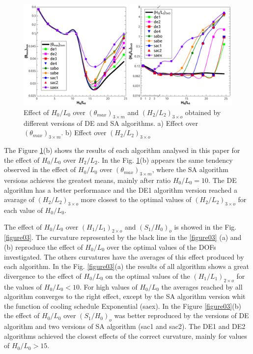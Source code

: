 \documentclass[12pt,fleqn]{article}
\begin{document}
\begin{figure}[H]
\centering
\includegraphics[width=1\linewidth]{imgs/4dof/de_sa_h0l0-tmin-4dof.png}
\caption{ {\small Effect of $H_{0}/L_{0}$ over $({\theta}_{max})_{3\times m}$ and $(H_{2}/L_{2})_{3\times o}$ obtained by different versions of DE and SA algorithms. a) Effect over $({\theta}_{max})_{3\times m}$. b) Effect over $(H_{2}/L_{2})_{3\times o}$ }}
\label{figure02}
\end{figure}

The Figure \ref{figure02}(b) shows the results of each algorithm analysed in this paper for the effect of  $H_{0}/L_{0}$ over $H_{2}/L_{2}$. In the Fig. \ref{figure02}(b) appears the same tendency observed in the effect of $H_{0}/L_{0}$ over $({\theta}_{max})_{3\times m}$, where the SA algorithm versions achieves the greatest means, mainly after ratio $H_{0}/L_{0}=10$. The DE algorithm has a better performance and the DE1 algorithm version reached a avarage of $(H_{2}/L_{2})_{3\times o}$ more closest to the optimal values of $(H_{2}/L_{2})_{3\times o}$ for each value of  $H_{0}/L_{0}$.

The effect of $H_{0}/L_{0}$ over $(H_{1}/L_{1})_{2\times o}$ and $(S_{1}/H_{0})_{o}$ is showed in the Fig. \ref{figure03}. The curvature represented by the black line in the \ref{figure03} (a) and (b) reproduce the effect of $H_{0}/L_{0}$ over the optimal values of the DOFs investigated. The others curvatures have the averages of this effect produced by each algorithm. In the Fig. \ref{figure03}(a) the results of all algorithm shows a great divergence to the effect of $H_{0}/L_{0}$ on the optimal values of the $(H_{1}/L_{1})_{2\times o}$ for the values of $H_{0}/L_{0}<10$. For high values of $H_{0}/L_{0}$ the averages reached by all algorithm converges to the right effect, except by the SA algorithm version whit the function of cooling schedule Exponential (saex). In the Figure \ref{figure03}(b) the effect of $H_{0}/L_{0}$ over $(S_{1}/H_{0})_{o}$ was better reproduced by the versions of DE algorithm and two versions of SA algorithm (sac1 and sac2). The DE1 and DE2 algorithms achieved the closest effects of the correct curvature, mainly for values of  $H_{0}/L_{0}>15$.
\end{document}
